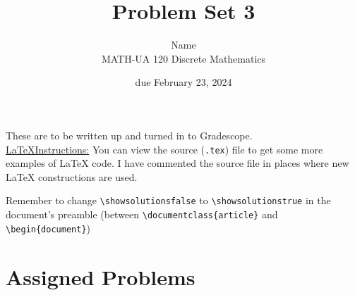\documentclass{article}
\title{Problem Set 3}
\author{%
    Name
\\  MATH-UA 120 Discrete Mathematics
}
\date{due February 23, 2024}
\newif\ifshowsolutions
\newcommand{\danger}{\marginpar[\hfill\dbend]{\dbend\hfill}}
\theoremstyle{definition}
\begin{document}
\maketitle



These are to be written up and turned in to Gradescope.\\



\ifshowsolutions
    \SetupExSheets{solution/print=true}
\else
    \danger
 \underline{ \LaTeX  Instructions:}  You can view the source (\texttt{.tex}) file to get some more examples of \LaTeX{} code.  I have commented the source file in places where new \LaTeX{} constructions are used.
  
  Remember to change \verb|\showsolutionsfalse| to \verb|\showsolutionstrue|
    in the document's preamble 
    (between \verb|\documentclass{article}| and \verb|\begin{document}|)
\fi

\section*{Assigned Problems}
\end{document}
